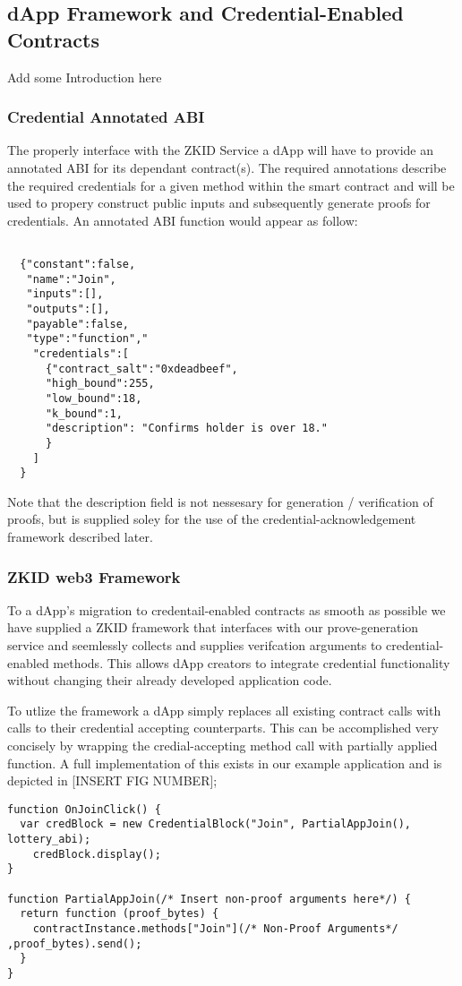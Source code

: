 \documentclass[11 pt]{extarticle}
\theoremstyle{remark}
\begin{document}
\subsection{dApp Framework and Credential-Enabled Contracts}

Add some Introduction here

\subsubsection{Credential Annotated ABI}
The properly interface with the ZKID Service a dApp will have to provide an annotated ABI for its dependant contract(s).
The required annotations describe the required credentials for a given method within the smart contract and will
be used to propery construct public inputs and subsequently generate proofs for credentials. An annotated ABI function
would appear as follow:
\begin{lstlisting}

  {"constant":false,
   "name":"Join",
   "inputs":[],
   "outputs":[],
   "payable":false,
   "type":"function","
    "credentials":[
      {"contract_salt":"0xdeadbeef",
      "high_bound":255,
      "low_bound":18,
      "k_bound":1,
      "description": "Confirms holder is over 18."
      }
    ]
  }
\end{lstlisting}

Note that the description field is not nessesary for generation / verification of proofs, but is supplied soley for
the use of the credential-acknowledgement framework described later. 

\subsubsection{ZKID web3 Framework}

To a dApp's migration to credentail-enabled contracts as smooth as possible we have supplied a ZKID framework that interfaces
with our prove-generation service and seemlessly collects and supplies verifcation arguments to credential-enabled methods. This 
allows dApp creators to integrate credential functionality without changing their already developed application code.

To utlize the framework a dApp simply replaces all existing contract calls with calls to their credential accepting counterparts. 
This can be accomplished very concisely by wrapping the credial-accepting method call with partially applied
function. A full implementation of this exists in our example application and is depicted in [INSERT FIG NUMBER];
\begin{lstlisting}
function OnJoinClick() {
  var credBlock = new CredentialBlock("Join", PartialAppJoin(), lottery_abi);
    credBlock.display();
}

function PartialAppJoin(/* Insert non-proof arguments here*/) {
  return function (proof_bytes) {
    contractInstance.methods["Join"](/* Non-Proof Arguments*/ ,proof_bytes).send();
  }
}

\end{lstlisting}
\end{document}
